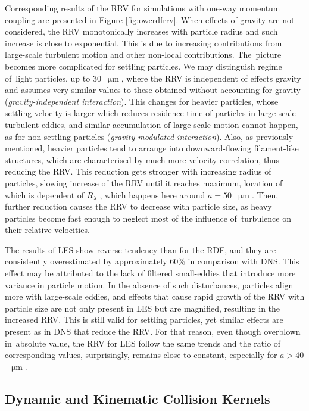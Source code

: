 \documentclass{pracamgren}
\begin{document}
Corresponding results of the RRV for simulations with one-way momentum coupling are presented in Figure \ref{fig:owcrdfrrv}.
When effects of gravity are not considered, the RRV monotonically increases with particle radius and such increase is close to exponential.
This is due to increasing contributions from large-scale turbulent motion and other non-local contributions.
The~picture becomes more complicated for settling particles.
We may distinguish regime of~light particles, up to $30$~$\upmu\text{m}$, where the RRV is independent of effects gravity and assumes very similar values to these obtained without accounting for gravity (\emph{gravity-independent interaction}).
This changes for heavier particles, whose settling velocity is larger which reduces residence time of particles in large-scale turbulent eddies, and similar accumulation of large-scale motion cannot happen, as for non-settling particles (\emph{gravity-modulated interaction}).
Also, as previously mentioned, heavier particles tend to arrange into downward-flowing filament-like structures, which are characterised by much more velocity correlation, thus reducing the RRV.
This reduction gets stronger with increasing radius of particles, slowing increase of the RRV until it reaches maximum, location of which is dependent of $R_{\lambda}$ \parencite{Rosa2013}, which happens here around $a = 50$~$\upmu\text{m}$.
Then, further reduction causes the RRV to decrease with particle size, as heavy particles become fast enough to neglect most of the influence of~turbulence on their relative velocities.

The results of LES show reverse tendency than for the RDF, and they are consistently overestimated by approximately $60 \%$ in comparison with DNS.
This effect may be attributed to the lack of filtered small-eddies that introduce more variance in particle motion.
In the absence of such disturbances, particles align more with large-scale eddies, and effects that cause rapid growth of the RRV with particle size are not only present in LES but are magnified, resulting in the increased RRV.
This is still valid for settling particles, yet similar effects are present as in DNS that reduce the RRV.
For that reason, even though overblown in~absolute value, the RRV for LES follow the same trends and the ratio of corresponding values, surprisingly, remains close to constant, especially for $a > 40$~$\upmu\text{m}$.     


\subsection{Dynamic and Kinematic Collision Kernels}
\label{ssc:ch2.coll.gamma}
\end{document}
